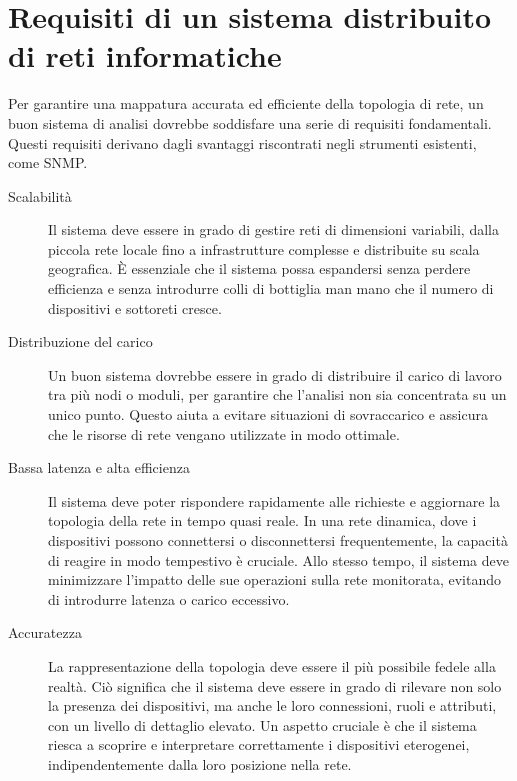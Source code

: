 \documentclass[target=bach,aauheader=,style=]{thud}
\begin{document}
\chapter{Requisiti di un sistema distribuito di reti informatiche}
Per garantire una mappatura accurata ed efficiente della topologia di rete, un buon sistema di analisi dovrebbe soddisfare una serie di requisiti fondamentali. Questi requisiti derivano dagli svantaggi riscontrati negli strumenti esistenti, come SNMP.

\begin{description}
  \item[Scalabilità]
  Il sistema deve essere in grado di gestire reti di dimensioni variabili, dalla piccola rete locale fino a infrastrutture complesse e distribuite su scala geografica. È essenziale che il sistema possa espandersi senza perdere efficienza e senza introdurre colli di bottiglia man mano che il numero di dispositivi e sottoreti cresce.

  \item[Distribuzione del carico]
  Un buon sistema dovrebbe essere in grado di distribuire il carico di lavoro tra più nodi o moduli, per garantire che l'analisi non sia concentrata su un unico punto. Questo aiuta a evitare situazioni di sovraccarico e assicura che le risorse di rete vengano utilizzate in modo ottimale.

  \item[Bassa latenza e alta efficienza]
  Il sistema deve poter rispondere rapidamente alle richieste e aggiornare la topologia della rete in tempo quasi reale. In una rete dinamica, dove i dispositivi possono connettersi o disconnettersi frequentemente, la capacità di reagire in modo tempestivo è cruciale. Allo stesso tempo, il sistema deve minimizzare l'impatto delle sue operazioni sulla rete monitorata, evitando di introdurre latenza o carico eccessivo.

  \item[Accuratezza]
  La rappresentazione della topologia deve essere il più possibile fedele alla realtà. Ciò significa che il sistema deve essere in grado di rilevare non solo la presenza dei dispositivi, ma anche le loro connessioni, ruoli e attributi, con un livello di dettaglio elevato. Un aspetto cruciale è che il sistema riesca a scoprire e interpretare correttamente i dispositivi eterogenei, indipendentemente dalla loro posizione nella rete.


\end{description}
\end{document}
